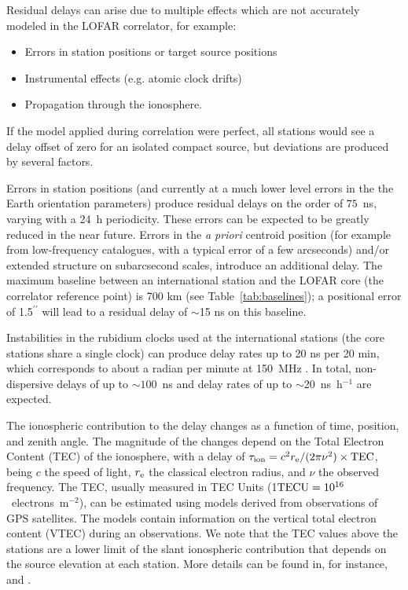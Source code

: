 \documentclass[graybox]{svmult}
\begin{document}
Residual delays can arise due to multiple effects which are not accurately modeled in the LOFAR correlator, 
for example:
\begin{itemize}
\item Errors in station positions or target source positions
\item Instrumental effects (e.g. atomic clock drifts)
\item Propagation through the ionosphere.
\end{itemize}
If the model applied during
correlation were perfect, all stations would see a delay offset of zero for an
isolated compact source, but deviations are produced by several factors. 

Errors in station positions (and currently at a much lower level errors in the
the Earth orientation parameters) produce residual delays on the order of $75$~ns,
varying with a 24~h periodicity. These errors can be expected to be greatly reduced 
in the near future.  
Errors in the {\em a priori} centroid position (for example from low-frequency
catalogues, with a typical error of a few arcseconds) and/or extended structure
on subarcsecond scales, introduce an additional delay.  The maximum baseline
between an international station and the LOFAR core (the correlator reference
point) is 700 km (see Table~\ref{tab:baselines}); a positional error of
1.5$^{\prime\prime}$ will lead to a residual delay of $\sim$15 ns on this
baseline.

Instabilities in the rubidium clocks used at the international stations (the
core stations share a single clock) can produce delay rates up to 20 ns per 20
min, which corresponds to about a radian per minute at 150~MHz
\citep{vanhaarlem13}.  
In total, non-dispersive delays of up to $\sim100$~ns and delay
rates of up to $\sim$20~ns~h$^{-1}$ are expected.  

The ionospheric contribution to the delay changes as a function of time,
position, and zenith angle.  The magnitude of the changes depend on the Total
Electron Content (TEC) of the ionosphere, with a delay of $\tau_{\rm
ion}=c^{2}r_{\rm e}/(2\pi\nu^{2})\times {\rm TEC}$, being $c$ the speed of
light, $r_{\rm e}$ the classical electron radius, and $\nu$ the observed
frequency. The TEC, usually measured in TEC Units (1${\rm
TECU}=10^{16}$~electrons~m$^{-2}$), can be estimated using models derived from
observations of GPS satellites.  
The models contain
information on the vertical total electron content (VTEC) during an
observations. We note that the TEC values above the stations are a lower limit
of the slant ionospheric contribution that depends on the source elevation at
each station. More details can be found in, for instance, \cite{nigl07} and
\cite{sotomayor13a}.
\end{document}
